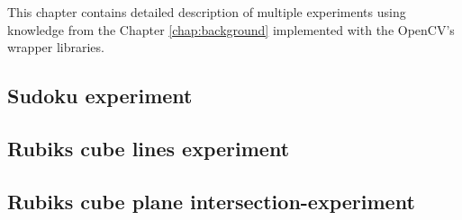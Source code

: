 \documentclass[../../main]{subfiles}
\begin{document}
This chapter contains detailed description of multiple experiments using knowledge from the Chapter \ref{chap:background} implemented with the \ac{OpenCV}'s wrapper libraries.

\subsection{Sudoku experiment}
\label{subsec:sudoku_experiment}

\newpage

\subsection{Rubiks cube lines experiment}

\newpage

\subsection{Rubiks cube plane intersection-experiment}

\newpage
\end{document}
